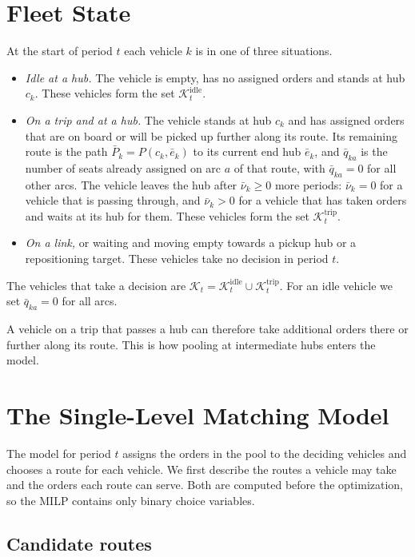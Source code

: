 \documentclass[12pt]{article}
\theoremstyle{plain}
\theoremstyle{definition}
\newcommand{\Kidle}{\mathcal{K}^{\mathrm{idle}}_t}
\newcommand{\Ktrip}{\mathcal{K}^{\mathrm{trip}}_t}
\newcommand{\Kdec}{\mathcal{K}_t}
\begin{document}
\section{Fleet State}\label{sec:state}

At the start of period $t$ each vehicle $k$ is in one of three situations.
\begin{itemize}
    \item \emph{Idle at a hub.} The vehicle is empty, has no assigned orders and stands at hub $c_k$. These vehicles form the set $\Kidle$.
    \item \emph{On a trip and at a hub.} The vehicle stands at hub $c_k$ and has assigned orders that are on board or will be picked up further along its route. Its remaining route is the path $\bar P_k=P(c_k,\bar e_k)$ to its current end hub $\bar e_k$, and $\bar q_{ka}$ is the number of seats already assigned on arc $a$ of that route, with $\bar q_{ka}=0$ for all other arcs. The vehicle leaves the hub after $\bar\nu_k\ge 0$ more periods: $\bar\nu_k=0$ for a vehicle that is passing through, and $\bar\nu_k>0$ for a vehicle that has taken orders and waits at its hub for them. These vehicles form the set $\Ktrip$.
    \item \emph{On a link,} or waiting and moving empty towards a pickup hub or a repositioning target. These vehicles take no decision in period $t$.
\end{itemize}
The vehicles that take a decision are $\Kdec=\Kidle\cup\Ktrip$. For an idle vehicle we set $\bar q_{ka}=0$ for all arcs.

A vehicle on a trip that passes a hub can therefore take additional orders there or further along its route. This is how pooling at intermediate hubs enters the model.

\section{The Single-Level Matching Model}\label{sec:model}

The model for period $t$ assigns the orders in the pool to the deciding vehicles and chooses a route for each vehicle. We first describe the routes a vehicle may take and the orders each route can serve. Both are computed before the optimization, so the MILP contains only binary choice variables.

\subsection{Candidate routes}
\end{document}
